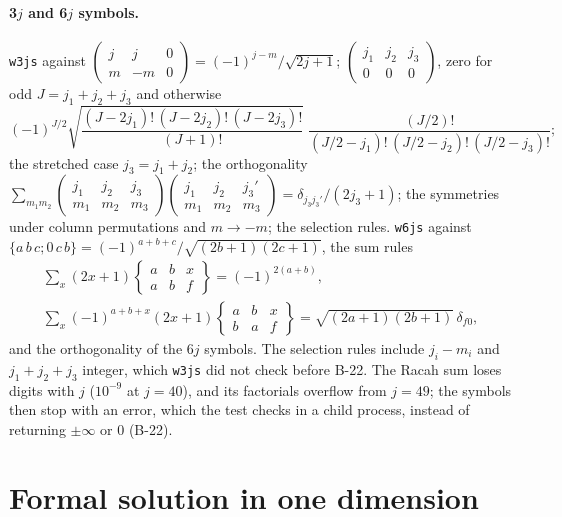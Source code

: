 \documentclass[11pt,a4paper]{article}
\newcommand{\code}[1]{\texttt{#1}}
\begin{document}
\paragraph{3$j$ and 6$j$ symbols.} \code{w3js} against
$\begin{pmatrix}j&j&0\\m&-m&0\end{pmatrix} = (-1)^{j-m}/\sqrt{2j+1}$;
$\begin{pmatrix}j_1&j_2&j_3\\0&0&0\end{pmatrix}$, zero for odd
$J=j_1+j_2+j_3$ and otherwise
\begin{equation}
(-1)^{J/2}\sqrt{\frac{(J-2j_1)!\,(J-2j_2)!\,(J-2j_3)!}{(J+1)!}}\;
\frac{(J/2)!}{(J/2-j_1)!\,(J/2-j_2)!\,(J/2-j_3)!};
\end{equation}
the stretched case $j_3=j_1+j_2$; the orthogonality
$\sum_{m_1m_2}\begin{pmatrix}j_1&j_2&j_3\\m_1&m_2&m_3\end{pmatrix}
\begin{pmatrix}j_1&j_2&j_3'\\m_1&m_2&m_3\end{pmatrix} =
\delta_{j_3j_3'}/(2j_3+1)$; the symmetries under column permutations and
$m\to-m$; the selection rules. \code{w6js} against
$\{a\,b\,c;0\,c\,b\} = (-1)^{a+b+c}/\sqrt{(2b+1)(2c+1)}$, the sum rules
\begin{gather}
\sum_x(2x+1)\begin{Bmatrix}a&b&x\\a&b&f\end{Bmatrix} = (-1)^{2(a+b)},\\
\sum_x(-1)^{a+b+x}(2x+1)\begin{Bmatrix}a&b&x\\b&a&f\end{Bmatrix} =
\sqrt{(2a+1)(2b+1)}\,\delta_{f0},
\end{gather}
and the orthogonality of the 6$j$ symbols. The selection rules include
$j_i-m_i$ and $j_1+j_2+j_3$ integer, which \code{w3js} did not check
before B-22. The Racah sum loses digits with $j$ ($10^{-9}$ at $j=40$),
and its factorials overflow from $j=49$; the symbols then stop with an
error, which the test checks in a child process, instead of returning
$\pm\infty$ or $0$ (B-22).

\section{Formal solution in one dimension}
\label{sec:formal1d}
\end{document}
